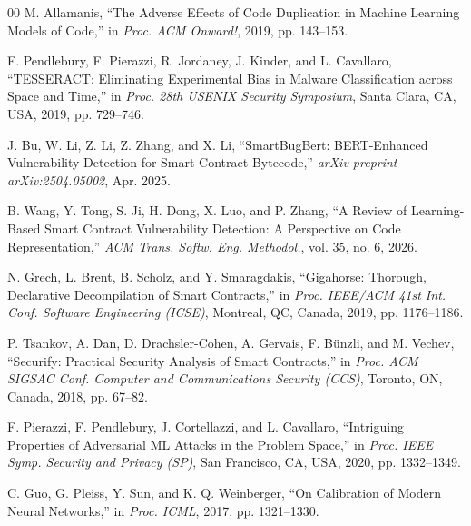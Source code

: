 \documentclass[conference]{IEEEtran}
\begin{document}
\begin{thebibliography}{00}
M. Allamanis, ``The Adverse Effects of Code Duplication in Machine Learning Models of Code,'' in \emph{Proc. ACM Onward!}, 2019, pp. 143--153.

F. Pendlebury, F. Pierazzi, R. Jordaney, J. Kinder, and L. Cavallaro, ``TESSERACT: Eliminating Experimental Bias in Malware Classification across Space and Time,'' in \emph{Proc. 28th USENIX Security Symposium}, Santa Clara, CA, USA, 2019, pp. 729--746.

J. Bu, W. Li, Z. Li, Z. Zhang, and X. Li, ``SmartBugBert: BERT-Enhanced Vulnerability Detection for Smart Contract Bytecode,'' \emph{arXiv preprint arXiv:2504.05002}, Apr. 2025.

B. Wang, Y. Tong, S. Ji, H. Dong, X. Luo, and P. Zhang, ``A Review of Learning-Based Smart Contract Vulnerability Detection: A Perspective on Code Representation,'' \emph{ACM Trans. Softw. Eng. Methodol.}, vol. 35, no. 6, 2026.

N. Grech, L. Brent, B. Scholz, and Y. Smaragdakis, ``Gigahorse: Thorough, Declarative Decompilation of Smart Contracts,'' in \emph{Proc. IEEE/ACM 41st Int. Conf. Software Engineering (ICSE)}, Montreal, QC, Canada, 2019, pp. 1176--1186.

P. Tsankov, A. Dan, D. Drachsler-Cohen, A. Gervais, F. B\"unzli, and M. Vechev, ``Securify: Practical Security Analysis of Smart Contracts,'' in \emph{Proc. ACM SIGSAC Conf. Computer and Communications Security (CCS)}, Toronto, ON, Canada, 2018, pp. 67--82.

F. Pierazzi, F. Pendlebury, J. Cortellazzi, and L. Cavallaro, ``Intriguing Properties of Adversarial ML Attacks in the Problem Space,'' in \emph{Proc. IEEE Symp. Security and Privacy (SP)}, San Francisco, CA, USA, 2020, pp. 1332--1349.

C. Guo, G. Pleiss, Y. Sun, and K. Q. Weinberger, ``On Calibration of Modern Neural Networks,'' in \emph{Proc. ICML}, 2017, pp. 1321--1330.

\end{thebibliography}
\end{document}
